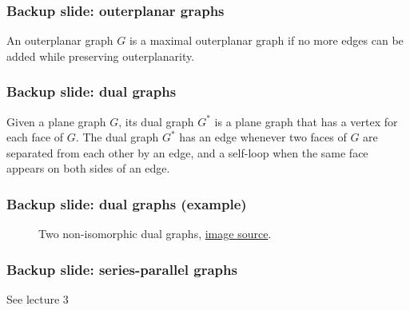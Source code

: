\documentclass[xetex,mathserif,serif]{beamer}
\begin{document}
\begin{frame}
  \frametitle{Backup slide: outerplanar graphs}

  \begin{definition}
    An outerplanar graph \(G\) is a maximal outerplanar graph if no more edges can be added while preserving outerplanarity.
  \end{definition}
\end{frame}

\begin{frame}
  \frametitle{Backup slide: dual graphs}

  \begin{definition}
    Given a plane graph \(G\), its dual graph \(G^*\) is a plane graph that has a vertex for each face of \(G\). The dual graph \(G^*\) has an edge whenever two faces of \(G\) are separated from each other by an edge, and a self-loop when the same face appears on both sides of an edge.
  \end{definition}
\end{frame}

\begin{frame}
  \frametitle{Backup slide: dual graphs (example)}

  \begin{figure}
    \begin{center}
      
    \end{center}
    \caption{Two non-isomorphic dual graphs, \href{https://en.wikipedia.org/wiki/Dual_graph\#/media/File:Noniso_dual_graphs.svg}{image source}.}
  \end{figure}
  \end{frame}

\begin{frame}
  \frametitle{Backup slide: series-parallel graphs}
  See lecture 3
\end{frame}


\end{document}
